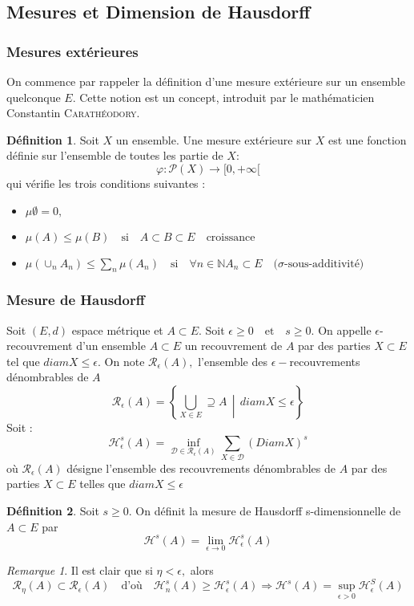 \documentclass[12pt,a4paper]{report}
\theoremstyle{plain}
\theoremstyle{plain}
\theoremstyle{definition}
\newtheorem{definition}{Définition}
\theoremstyle{remark}
\newtheorem*{rmq}{Remarque}
\newcommand{\enstq}[2]{\left\{#1\,\middle|\,#2\right\}}
\newcommand{\ensnombre}[1]{\mathbb{#1}}
\newcommand{\N}[1]{\ensnombre{N}}
\newcommand{\textm}[1]{\quad \text{#1} \quad}
\begin{document}
	\subsection{Mesures et Dimension de Hausdorff}
	\subsubsection{Mesures extérieures}
On commence par rappeler la définition d'une mesure extérieure sur un ensemble quelconque $E$. Cette notion est un concept, introduit par le mathématicien Constantin \textsc{Carathéodory}. 

\begin{definition}
Soit $X$ un ensemble. Une mesure extérieure sur $X$ est une fonction définie sur l'ensemble de toutes les partie de $X$:
\[\varphi : \mathcal{P}(X) \longrightarrow [0, +\infty[\]
qui vérifie les trois conditions suivantes :
\begin{itemize}
\item $\mu \emptyset = 0,$
\item $\mu(A)\leq \mu (B) \textm{si} A\subset B \subset E \textm{croissance}$
\item $\mu (\cup_n A_n) \leq \sum_n \mu (A_n) \textm{si} \forall n \in \N, A_n \subset E \textm{($\sigma$-sous-additivité)}$
\end{itemize}
\end{definition}

	\subsubsection{Mesure de Hausdorff}
Soit $(E,d)$ espace métrique et $A \subset E.$ Soit $\epsilon \geq 0 \textm{et} s \geq 0.$ On appelle $\epsilon$-recouvrement d'un ensemble $A \subset E$ un recouvrement de $A$ par des parties $X \subset E$ tel que $diam X \leq \epsilon.$ On note $\mathcal{R}_\epsilon(A),$ l'ensemble des $\epsilon-$recouvrements dénombrables de $A$
\[\mathcal{R}_\epsilon (A)= \enstq{\bigcup_{X \in E}\supseteq A}{diam X \leq \epsilon}\]
Soit :
\[\mathcal{H}_\epsilon^s (A) = \inf_{\mathcal{D}\in \mathcal{R}_\epsilon(A)}\sum_{X \in \mathcal{D}}(Diam X)^s\]
où $\mathcal{R}_\epsilon (A)$ désigne l'ensemble des recouvrements dénombrables de $A$ par des parties $X \subset E$ telles que $diam X \leq \epsilon$

\begin{definition}
Soit $s \geq 0.$ On définit la mesure de Hausdorff s-dimensionnelle de $A \subset E$ par
\[\mathcal{H}^s(A) = \lim\limits_{\epsilon \rightarrow 0} \mathcal{H}_\epsilon^s(A)\]
\end{definition}
\begin{rmq}
Il est clair que si $\eta < \epsilon,$ alors \[\mathcal{R}_\eta (A) \subset \mathcal{R}_\epsilon(A) \textm{d'où} 
\mathcal{H}_n^s(A)\geq\mathcal{H}_\epsilon^s(A) \Rightarrow \mathcal{H}^s(A) = \sup_{\epsilon > 0}\mathcal{H}_\epsilon^S(A)\]
\end{rmq}
\end{document}
